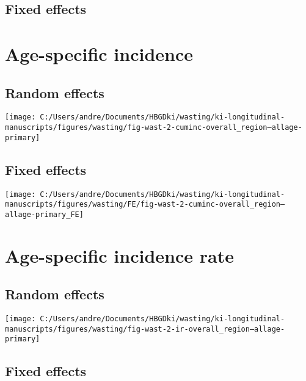 \documentclass[
  9pt,
]{book}
\begin{document}
\hypertarget{fixed-effects-1}{%
\subsection{Fixed effects}\label{fixed-effects-1}}

\hypertarget{age-specific-incidence}{%
\section{Age-specific incidence}\label{age-specific-incidence}}

\hypertarget{random-effects-1}{%
\subsection{Random effects}\label{random-effects-1}}

\texttt{[image: C:/Users/andre/Documents/HBGDki/wasting/ki-longitudinal-manuscripts/figures/wasting/fig-wast-2-cuminc-overall\_region--allage-primary]}

\hypertarget{fixed-effects-2}{%
\subsection{Fixed effects}\label{fixed-effects-2}}

\texttt{[image: C:/Users/andre/Documents/HBGDki/wasting/ki-longitudinal-manuscripts/figures/wasting/FE/fig-wast-2-cuminc-overall\_region--allage-primary\_FE]}

\hypertarget{age-specific-incidence-rate}{%
\section{Age-specific incidence rate}\label{age-specific-incidence-rate}}

\hypertarget{random-effects-2}{%
\subsection{Random effects}\label{random-effects-2}}

\texttt{[image: C:/Users/andre/Documents/HBGDki/wasting/ki-longitudinal-manuscripts/figures/wasting/fig-wast-2-ir-overall\_region--allage-primary]}

\hypertarget{fixed-effects-3}{%
\subsection{Fixed effects}\label{fixed-effects-3}}
\end{document}
